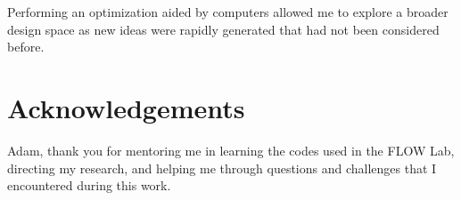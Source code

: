 \documentclass[journal ]{new-aiaa}
\begin{document}
Performing an optimization aided by computers allowed me to explore a broader design space as new ideas were rapidly generated that had not been considered before.


\section{Acknowledgements}

Adam, thank you for mentoring me in learning the codes used in the FLOW Lab, directing my research, and helping me through questions and challenges that I encountered during this work.




\end{document}
